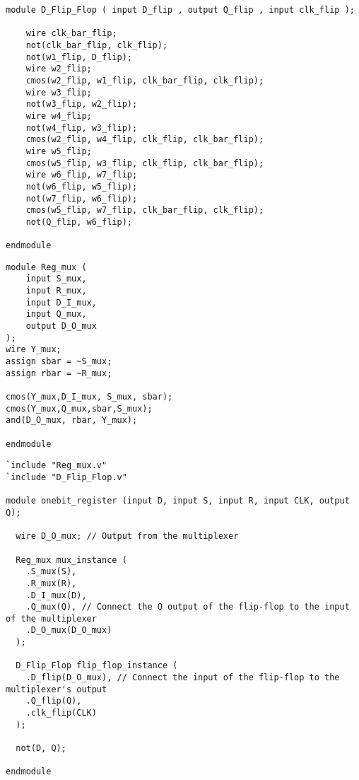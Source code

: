\begin{lstlisting}[style=verilogStyle, caption=D Flip-Flop in Verilog, label=verilog_dflipflop]
module D_Flip_Flop ( input D_flip , output Q_flip , input clk_flip );
	
	wire clk_bar_flip; 
	not(clk_bar_flip, clk_flip);
	not(w1_flip, D_flip);	  
	wire w2_flip;
	cmos(w2_flip, w1_flip, clk_bar_flip, clk_flip);	
	wire w3_flip;
	not(w3_flip, w2_flip); 
	wire w4_flip;
	not(w4_flip, w3_flip);
	cmos(w2_flip, w4_flip, clk_flip, clk_bar_flip);	 
	wire w5_flip;
	cmos(w5_flip, w3_flip, clk_flip, clk_bar_flip);
	wire w6_flip, w7_flip;
	not(w6_flip, w5_flip);
	not(w7_flip, w6_flip);
	cmos(w5_flip, w7_flip, clk_bar_flip, clk_flip);	 
	not(Q_flip, w6_flip);

endmodule
\end{lstlisting}

\begin{lstlisting}[style=verilogStyle, caption=Set/Reset-Circuit in Verilog, label=verilog_regmux]
module Reg_mux (
    input S_mux,
    input R_mux,
    input D_I_mux,
    input Q_mux,
    output D_O_mux
);			  
wire Y_mux;	
assign sbar = ~S_mux;
assign rbar = ~R_mux;  

cmos(Y_mux,D_I_mux, S_mux, sbar);
cmos(Y_mux,Q_mux,sbar,S_mux);
and(D_O_mux, rbar, Y_mux);

endmodule  
\end{lstlisting}

\begin{lstlisting}[style=verilogStyle, caption=1-bit Register in Verilog, label=verilog_1bitregister]
`include "Reg_mux.v"
`include "D_Flip_Flop.v"

module onebit_register (input D, input S, input R, input CLK, output Q);

  wire D_O_mux; // Output from the multiplexer 

  Reg_mux mux_instance (
    .S_mux(S),
    .R_mux(R),
    .D_I_mux(D), 
    .Q_mux(Q), // Connect the Q output of the flip-flop to the input of the multiplexer  
    .D_O_mux(D_O_mux)
  );

  D_Flip_Flop flip_flop_instance (
    .D_flip(D_O_mux), // Connect the input of the flip-flop to the multiplexer's output
    .Q_flip(Q),
    .clk_flip(CLK)
  );  
  
  not(D, Q);

endmodule
\end{lstlisting}

